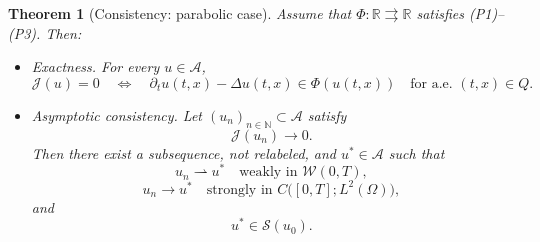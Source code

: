 \documentclass[11pt]{elsarticle}
\newtheorem{theorem}{Theorem}[section]
\theoremstyle{definition}
\theoremstyle{remark}
\numberwithin{equation}{section}
\begin{document}
	\begin{theorem}[Consistency: parabolic case]
		\label{thm:consistency-parabolic}
		Assume that $\Phi:\mathbb{R}\rightrightarrows\mathbb{R}$
		satisfies \textup{(P1)--(P3)}. Then:
		
		\begin{itemize}
			\item[(a)] \emph{Exactness.} For every $u\in\mathcal{A}$,
			\[
			\mathcal{J}(u)=0
			\quad\Longleftrightarrow\quad
			\partial_tu(t,x)-\Delta u(t,x)
			\in\Phi(u(t,x))
			\quad\text{for a.e. }(t,x)\in Q.
			\]
			
			\item[(b)] \emph{Asymptotic consistency.} Let
			$(u_n)_{n\in\mathbb{N}}\subset\mathcal{A}$ satisfy
			\[
			\mathcal{J}(u_n)\longrightarrow 0.
			\]
			Then there exist a subsequence, not relabeled, and
			$u^\ast\in\mathcal{A}$ such that
			\[
			u_n\rightharpoonup u^\ast
			\quad\text{weakly in }\mathcal{W}(0,T),
			\]
			\[
			u_n\longrightarrow u^\ast
			\quad\text{strongly in }
			C\bigl([0,T];L^2(\Omega)\bigr),
			\]
			and
			\[
			u^\ast\in\mathcal{S}(u_0).
			\]
		\end{itemize}
	\end{theorem}
	
\end{document}

